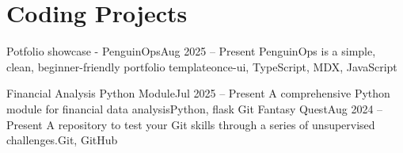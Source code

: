 \section{Coding Projects}
\resumeSubHeadingList
\resumeSubheading
      {Potfolio showcase - PenguinOps}{Aug 2025 -- Present} 
      {PenguinOps is a simple, clean, beginner-friendly portfolio template}{once-ui, TypeScript, MDX, JavaScript}
      \resumeSubHeadingList
      \resumeSubHeadingListEnd

      \resumeSubheading
      {Financial Analysis Python Module}{Jul 2025 -- Present} 
      {A comprehensive Python module for financial data analysis}{Python, flask}
      \resumeSubHeadingList
      \resumeSubHeadingListEnd
  \resumeSubheading
      {Git Fantasy Quest}{Aug 2024 -- Present}
      {A repository to test your Git skills through a series of unsupervised challenges.}{Git, GitHub}
      \resumeSubHeadingList
      \resumeSubHeadingListEnd  
\resumeSubHeadingListEnd